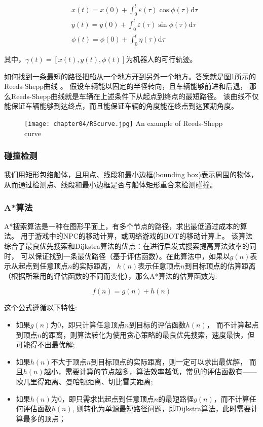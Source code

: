 \begin{equation}
  \begin{aligned}
    & x(t)=x(0)+\int_0^t \varepsilon( \tau ) \cos \phi (\tau) \mathrm{d} \tau   \\
    & y(t)=y(0)+\int_0^t \varepsilon( \tau ) \sin \phi (\tau) \mathrm{d} \tau   \\
    & \phi (t)= \phi (0) + \int_0^t \eta (\tau) \mathrm{d} \tau
  \end{aligned}
\end{equation}

其中，$\gamma(t)=[x(t), y(t), \phi(t)]$为机器人的可行轨迹。

如何找到一条最短的路径把船从一个地方开到另外一个地方。答案就是图\ref{fig:rscurve}所示的
Reeds-Shepp曲线\cite{reeds1990} 。
假设车辆能以固定的半径转向，且车辆能够前进和后退，
那么Reeds-Shepp曲线就是车辆在上述条件下从起点到终点的最短路径。
该曲线不仅能保证车辆能够到达终点，而且能保证车辆的角度能在终点到达预期角度。


\begin{figure}[!htp]
  \centering
  \texttt{[image: chapter04/RScurve.jpg]}
    {An example of Reeds-Shepp curve}
  \label{fig:rscurve}
\end{figure}


\subsubsection{碰撞检测}
我们用矩形包络船体，且用点、线段和最小边框(bounding box)表示周围的物体，
从而通过检测点、线段和最小边框是否与船体矩形重合来检测碰撞。


\subsubsection{A*算法}
A*搜索算法是一种在图形平面上，有多个节点的路径，求出最低通过成本的算法。
用于游戏中的NPC的移动计算，或网络游戏的BOT的移动计算上。
该算法综合了最良优先搜索和Dijkstra算法的优点：在进行启发式搜索提高算法效率的同时，
可以保证找到一条最优路径（基于评估函数）。在此算法中，如果以$g(n)$表示从起点到任意顶点$n$的实际距离，
$h(n)$表示任意顶点$n$到目标顶点的估算距离（根据所采用的评估函数的不同而变化），那么A*算法的估算函数为:

\begin{equation}
  f(n)=g(n)+h(n)
\end{equation}

这个公式遵循以下特性:
\begin{itemize}
  \item 
  如果$g(n)$为0，即只计算任意顶点$n$到目标的评估函数$h(n)$，
  而不计算起点到顶点$n$的距离，则算法转化为使用贪心策略的最良优先搜索，速度最快，但可能得不出最优解;
  \item 
  如果$h(n)$不大于顶点$n$到目标顶点的实际距离，则一定可以求出最优解，
  而且$h(n)$越小，需要计算的节点越多，算法效率越低，常见的评估函数有——欧几里得距离、曼哈顿距离、切比雪夫距离;
  \item 
  如果$h(n)$为0，即只需求出起点到任意顶点$n$的最短路径$g(n)$，而不计算任何评估函数$h(n)$, 
  则转化为单源最短路径问题，即Dijkstra算法，此时需要计算最多的顶点；
\end{itemize}


